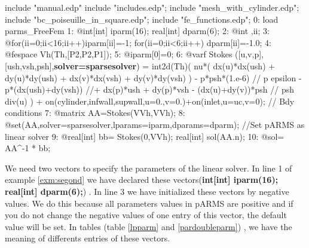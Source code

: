 \documentclass[a4paper,twoside,12pt]{book}
\begin{document}
\begin{example}\label{exm:segond}
\bFF
include "manual.edp"
include "includes.edp";
include "mesh_with_cylinder.edp";
include "bc_poiseuille_in_square.edp";
include "fe_functions.edp";
0: load parms_FreeFem
1: @int[int] iparm(16); real[int] dparm(6);
2: @int ,ii;
3: @for(ii=0;ii<16;ii++){iparm[ii]=-1;}  for(ii=0;ii<6;ii++) dparm[ii]=-1.0;
4: @fespace Vh(Th,[P2,P2,P1]);
5: @iparm[0]=0;
6: @varf Stokes ([u,v,p],[ush,vsh,psh],\textbf{solver=sparsesolver}) =
 int2d(Th)( nu*( dx(u)*dx(ush) + dy(u)*dy(ush) + dx(v)*dx(vsh) + dy(v)*dy(vsh) )
            - p*psh*(1.e-6)          			         // p epsilon
            - p*(dx(ush)+dy(vsh))   //+ dx(p)*ush + dy(p)*vsh
            - (dx(u)+dy(v))*psh                        	 // psh div(u)
  )
 + on(cylinder,infwall,supwall,u=0.,v=0.)+on(inlet,u=uc,v=0);    // Bdy conditions
7: @matrix AA=Stokes(VVh,VVh);
8: @set(AA,solver=sparsesolver,lparams=iparm,dparams=dparm); //Set pARMS as linear solver
9: @real[int] bb= Stokes(0,VVh); real[int] sol(AA.n);
10: @sol= AA^-1 * bb;
\eFF
\end{example}
We need two vectors to specify the parameters of the linear solver. In line 1 of
example \ref{exm:segond}
we have declared these vectors(\textbf{int[int] iparm(16); real[int] dparm(6);})
. In line 3 we have initialized these  vectors by
negative values. We do this because all parameters values in pARMS are positive
and if you do not change the negative values of
one entry of this vector, the default value will be set.
In tables (table \ref{lpparm} and \ref{pardoubleparm}) , we have the meaning  of
differents entries of these vectors.
\end{document}
